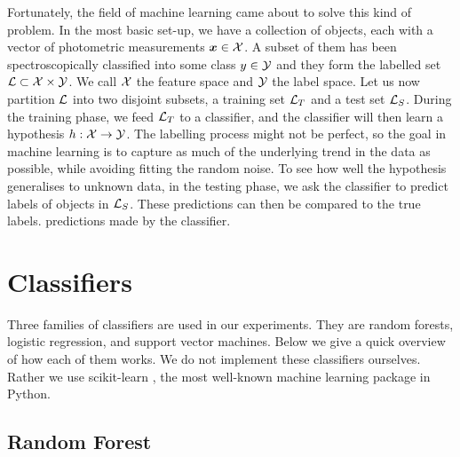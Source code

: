 Fortunately, the field of machine learning came about to solve this kind of problem. In the most
basic set-up, we have a collection of objects, each with a vector of photometric measurements
$\bm{x} \in \mathcal{X}$. A subset of them has been spectroscopically classified into some class $y \in \mathcal{Y}$
and they form the labelled set $\mathcal{L} \subset \mathcal{X} \times \mathcal{Y}$. We call $\mathcal{X}$ the feature space and
$\mathcal{Y}$ the label space. Let us now partition $\mathcal{L}$ into two disjoint subsets, a training set
$\mathcal{L}_T$ and a test set $\mathcal{L}_S$. During the training phase, we feed  $\mathcal{L}_T$ to a
classifier, and the classifier will then learn a hypothesis $h: \mathcal{X} \rightarrow \mathcal{Y}$. The labelling
process might not be perfect, so the goal in machine learning is to capture as much of the
underlying trend in the data as possible, while avoiding fitting the random noise. To see how well
the hypothesis generalises to unknown data, in the testing phase, we ask the classifier to predict
labels of objects in  $\mathcal{L}_S$. These predictions can then be compared to the true labels.
predictions made by the classifier.


\section{Classifiers}
\label{sec:classifiers}

Three families of classifiers are used in our experiments. They are random forests, logistic
regression, and support vector machines. Below we give a quick overview of how each of them works.
We do not implement these classifiers ourselves. Rather we use scikit-learn \cite{pedregosa11}, the
most well-known machine learning package in Python.

\subsection{Random Forest}
\label{sub:forest}

